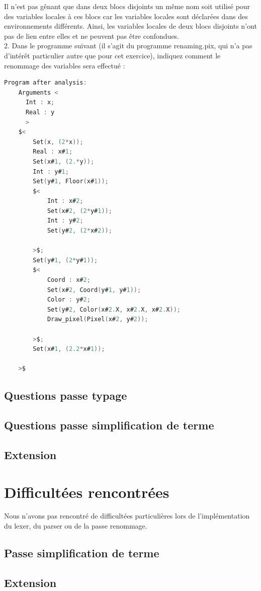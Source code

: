 \documentclass{report}
\begin{document}
    \quad Il n'est pas gênant que dans deux blocs disjoints un même nom soit utilisé pour des variables locales à ces blocs car les variables locales sont déclarées dans des environnements différents. Ainsi, les variables locales de deux blocs disjoints n'ont pas de lien entre elles et ne peuvent pas être confondues.\\

    2. Dans le programme suivant (il s'agit du programme renaming.pix, qui n'a pas d'intérêt particulier autre que pour cet exercice), indiquez comment le renommage des variables sera effectué :\\
    
    \begin{lstlisting}[language=C, basicstyle=\ttfamily]
    Program after analysis:
    Arguments <
      Int : x;
      Real : y
      >
    $<
        Set(x, (2*x));
        Real : x#1;
        Set(x#1, (2.*y));
        Int : y#1;
        Set(y#1, Floor(x#1));
        $<
            Int : x#2;
            Set(x#2, (2*y#1));
            Int : y#2;
            Set(y#2, (2*x#2));
            
        >$;
        Set(y#1, (2*y#1));
        $<
            Coord : x#2;
            Set(x#2, Coord(y#1, y#1));
            Color : y#2;
            Set(y#2, Color(x#2.X, x#2.X, x#2.X));
            Draw_pixel(Pixel(x#2, y#2));
            
        >$;
        Set(x#1, (2.2*x#1));
        
    >$
    \end{lstlisting}

    \newpage


    \section{Questions passe typage}

    \newpage


    \section{Questions passe simplification de terme}

    \newpage

    \section{Extension}

    \newpage

\chapter{Difficultées rencontrées}

   \quad Nous n'avons pas rencontré de difficultées particulières lors de l'implémentation du lexer, du parser ou de la passe renommage.\\

    \section{Passe simplification de terme}

    \section{Extension}
\end{document}
